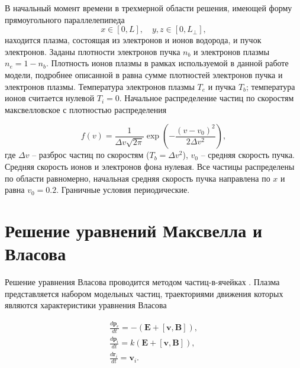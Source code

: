 В начальный момент времени в трехмерной области
решения, имеющей форму прямоугольного параллелепипеда $$
x\in[0,L],\quad y,z\in[0,L_\bot], $$ находится плазма, состоящая из
электронов и ионов водорода, и пучок электронов. Заданы плотности электронов пучка $n_b$ и электронов плазмы $n_e = 1-n_b$. Плотность ионов плазмы в рамках используемой в данной работе модели, подробнее описанной в \cite{VychMetPlasma} равна сумме плотностей электронов пучка и электронов плазмы. Температура электронов плазмы $T_e$ и пучка $T_b$; температура ионов считается нулевой $T_i=0$. Начальное распределение частиц по скоростям макс\-вел\-ловс\-кое с плотностью распределения

$$
f(v)=\frac{1}{\Delta v \sqrt{2
		\pi}}\exp \left( {-\frac{(v-v_0)^2}{2 \Delta v^2}}\right) ,
$$
где $\Delta v$ -- разброс частиц по скоростям ($T_b=\Delta v^2$), $v_0$ -- средняя
скорость пучка. Средняя скорость ионов и электронов фона нулевая. Все частицы распределены по области равномерно, начальная средняя скорость пучка направлена по $x$ и равна $v_0=0.2$. Граничные условия периодические. 








\section{Решение уравнений Максвелла и Власова}

Решение уравнения Власова проводится методом
частиц-в-ячейках \cite{hockney, birdsall2004plasma,VshivkovPICbook}. Плазма представляется набором модельных частиц, траекториями движения которых являются характеристики урав\-не\-ния Власова

\begin{equation}\label{eq:char}
\begin{array}{c}
\frac{d {\textbf{p}} _{e}}{d t}=-(\textbf{E}+[\textbf{v},\textbf{B}]), \\
\frac{d {\textbf{p}} _{i}}{d t}=k(\textbf{E}+[\textbf{v},\textbf{B}]), \\
\frac{d {\textbf{r}} _{i}}{d t}={\textbf{v}}_{i}.
\end{array}
\end{equation}


